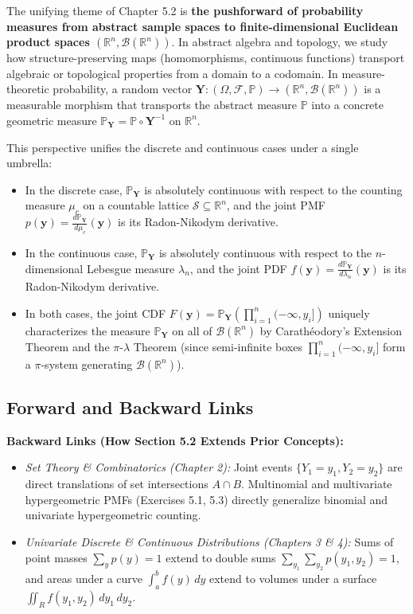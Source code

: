 \documentclass[11pt, letterpaper]{article}
\theoremstyle{definition}
\theoremstyle{remark}
\begin{document}
The unifying theme of Chapter 5.2 is \textbf{the pushforward of probability measures from abstract sample spaces to finite-dimensional Euclidean product spaces $(\mathbb{R}^n, \mathcal{B}(\mathbb{R}^n))$}. In abstract algebra and topology, we study how structure-preserving maps (homomorphisms, continuous functions) transport algebraic or topological properties from a domain to a codomain. In measure-theoretic probability, a random vector $\mathbf{Y} : (\Omega, \mathcal{F}, \mathbb{P}) \to (\mathbb{R}^n, \mathcal{B}(\mathbb{R}^n))$ is a measurable morphism that transports the abstract measure $\mathbb{P}$ into a concrete geometric measure $\mathbb{P}_{\mathbf{Y}} = \mathbb{P} \circ \mathbf{Y}^{-1}$ on $\mathbb{R}^n$.

This perspective unifies the discrete and continuous cases under a single umbrella:
\begin{itemize}
    \item In the discrete case, $\mathbb{P}_{\mathbf{Y}}$ is absolutely continuous with respect to the counting measure $\mu_c$ on a countable lattice $\mathcal{S} \subseteq \mathbb{R}^n$, and the joint PMF $p(\mathbf{y}) = \frac{d\mathbb{P}_{\mathbf{Y}}}{d\mu_c}(\mathbf{y})$ is its Radon-Nikodym derivative.
    \item In the continuous case, $\mathbb{P}_{\mathbf{Y}}$ is absolutely continuous with respect to the $n$-dimensional Lebesgue measure $\lambda_n$, and the joint PDF $f(\mathbf{y}) = \frac{d\mathbb{P}_{\mathbf{Y}}}{d\lambda_n}(\mathbf{y})$ is its Radon-Nikodym derivative.
    \item In both cases, the joint CDF $F(\mathbf{y}) = \mathbb{P}_{\mathbf{Y}}\!\left(\prod_{i=1}^n (-\infty, y_i]\right)$ uniquely characterizes the measure $\mathbb{P}_{\mathbf{Y}}$ on all of $\mathcal{B}(\mathbb{R}^n)$ by Carath\'eodory's Extension Theorem and the $\pi$-$\lambda$ Theorem (since semi-infinite boxes $\prod_{i=1}^n (-\infty, y_i]$ form a $\pi$-system generating $\mathcal{B}(\mathbb{R}^n)$).
\end{itemize}

\subsection{Forward and Backward Links}

\textbf{Backward Links (How Section 5.2 Extends Prior Concepts):}
\begin{itemize}
    \item \emph{Set Theory \& Combinatorics (Chapter 2):} Joint events $\{Y_1 = y_1, Y_2 = y_2\}$ are direct translations of set intersections $A \cap B$. Multinomial and multivariate hypergeometric PMFs (Exercises 5.1, 5.3) directly generalize binomial and univariate hypergeometric counting.
    \item \emph{Univariate Discrete \& Continuous Distributions (Chapters 3 \& 4):} Sums of point masses $\sum_y p(y) = 1$ extend to double sums $\sum_{y_1}\sum_{y_2} p(y_1, y_2) = 1$, and areas under a curve $\int_a^b f(y)\,dy$ extend to volumes under a surface $\iint_R f(y_1, y_2)\,dy_1\,dy_2$.
\end{itemize}
\end{document}
